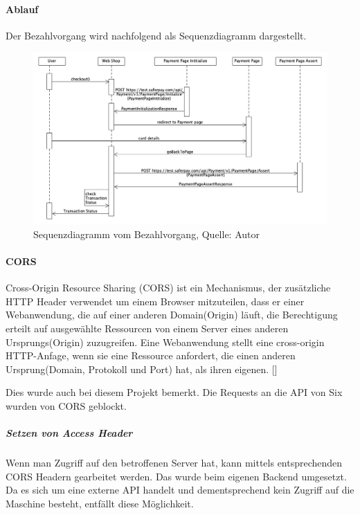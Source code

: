 \paragraph{Ablauf}
Der Bezahlvorgang wird nachfolgend als Sequenzdiagramm dargestellt.
\begin{figure}[H]
	\centering
	\includegraphics[width=1\textwidth]{images/paymentSequence.PNG}
	\caption[Sequenzdiagramm vom Bezahlvorgang]{Sequenzdiagramm vom Bezahlvorgang, Quelle: Autor}
	\label{img: paymentSequence}
\end{figure} 

\paragraph{CORS}\label{CORS}
\glqq Cross-Origin Resource Sharing (CORS) ist ein Mechanismus, der zusätzliche HTTP Header verwendet um einem Browser mitzuteilen, dass er einer Webanwendung, die auf einer anderen Domain(Origin) läuft, die Berechtigung erteilt auf ausgewählte Ressourcen von einem Server eines anderen Ursprungs(Origin) zuzugreifen. Eine Webanwendung stellt eine cross-origin HTTP-Anfage, wenn sie eine Ressource anfordert, die einen anderen Ursprung(Domain, Protokoll und Port) hat, als ihren eigenen.\grqq{} [\cite{cors}]

Dies wurde auch bei diesem Projekt bemerkt. Die Requests an die \ac{API} von Six wurden von \ac{CORS} geblockt. 

\subparagraph{Setzen von Access Header}
Wenn man Zugriff auf den betroffenen Server hat, kann mittels entsprechenden CORS Headern gearbeitet werden. Das wurde beim eigenen Backend umgesetzt. Da es sich um eine externe API handelt und dementsprechend kein Zugriff auf die Maschine besteht, entfällt diese Möglichkeit. 


